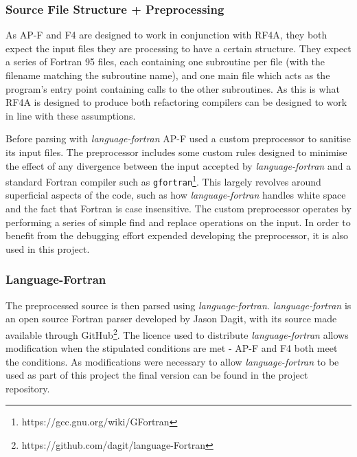 \documentclass{mpaper}
\begin{document}
\subsubsection*{Source File Structure + Preprocessing}

As AP-F and F4 are designed to work in conjunction with RF4A, they both expect the input files they are processing to have a certain structure.
They expect a series of Fortran 95 files, each containing one subroutine per file (with the filename matching the subroutine name), and one main file which acts as the program's entry point containing calls to the other subroutines.
As this is what RF4A is designed to produce both refactoring compilers can be designed to work in line with these assumptions. 

Before parsing with \textit{language-fortran} AP-F used a custom preprocessor to sanitise its input files. 
The preprocessor includes some custom rules designed to minimise the effect of any divergence between the input accepted by \textit{language-fortran} and a standard Fortran compiler such as \texttt{gfortran}\footnote{https://gcc.gnu.org/wiki/GFortran}. 
This largely revolves around superficial aspects of the code, such as how \textit{language-fortran} handles white space and the fact that Fortran is case insensitive. 
The custom preprocessor operates by performing a series of simple find and replace operations on the input.
In order to benefit from the debugging effort expended developing the preprocessor, it is also used in this project.


\subsubsection*{Language-Fortran}

The preprocessed source is then parsed using \textit{language-fortran}.
\textit{language-fortran} is an open source Fortran parser developed by Jason Dagit, with its source made available through GitHub\footnote{https://github.com/dagit/language-Fortran}.
The licence used to distribute \textit{language-fortran} allows modification when the stipulated conditions are met - AP-F and F4 both meet the conditions.
As modifications were necessary to allow \textit{language-fortran} to be used as part of this project the final version can be found in the project repository. 
\end{document}
